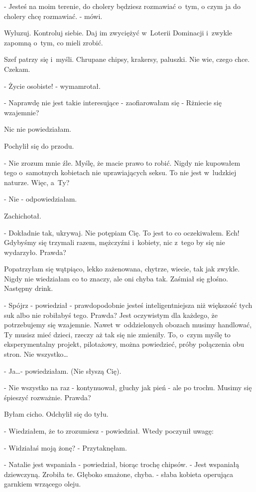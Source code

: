 \documentclass[oneside,polish,12pt,sfheadings]{mwbk}
\begin{document}
- Jesteś na moim terenie, do cholery będziesz rozmawiać o~tym,
o czym ja do cholery chcę rozmawiać. - mówi.

Wyluzuj. Kontroluj siebie. Daj im zwyciężyć w~Loterii Dominacji i~zwykle zapomną o~tym, co mieli zrobić.

Szef patrzy się i~myśli. Chrupane chipsy, krakersy, paluszki. Nie
wie, czego chce. Czekam.

- Życie osobiste! - wymamrotał.

- Naprawdę nie jest takie interesujące - zaofiarowałam się - Rżniecie
się wzajemnie?

Nic nie powiedziałam.

Pochylił się do przodu. 

- Nie zrozum mnie źle. Myślę, że macie prawo
to robić. Nigdy nie kupowałem tego o~samotnych kobietach nie uprawiających
seksu. To nie jest w~ludzkiej naturze. Więc, a~Ty?

- Nie - odpowiedziałam.

Zachichotał. 

- Dokładnie tak, ukrywaj. Nie potępiam Cię. To jest to
co oczekiwałem. Ech! Gdybyśmy się trzymali razem, mężczyźni i~kobiety,
nic z~tego by się nie wydarzyło. Prawda?

Popatrzyłam się wątpiąco, lekko zażenowana, chytrze, wiecie, tak
jak zwykle. Nigdy nie wiedziałam co to znaczy, ale oni chyba tak.
Zaśmiał się głośno. Następny drink.

- Spójrz - powiedział - prawdopodobnie jesteś inteligentniejsza niż
większość tych suk albo nie robiłabyś tego. Prawda? Jest oczywistym
dla każdego, że potrzebujemy się wzajemnie. Nawet w~oddzielonych obozach
musimy handlować, Ty musisz mieć dzieci, rzeczy aż tak się nie zmieniły.
To, o~czym myślę to eksperymentalny projekt, pilotażowy, można powiedzieć,
próby połączenia obu stron. Nie wszystko\ldots

- Ja\ldots - powiedziałam. (Nie słyszą Cię).

- Nie wszystko na raz - kontynuował, głuchy jak pień - ale po trochu. Musimy się śpieszyć rozważnie. Prawda?

Byłam cicho. Odchylił się do tyłu. 

- Wiedziałem, że to zrozumiesz - powiedział. Wtedy poczynił uwagę: 

- Widziałaś moją żonę? - Przytaknęłam.

- Natalie jest wspaniała - powiedział, biorąc trochę chipsów. - Jest
wspaniałą dziewczyną. Zrobiła te. Głęboko smażone, chyba. - słaba
kobieta operująca garnkiem wrzącego oleju.
\end{document}
